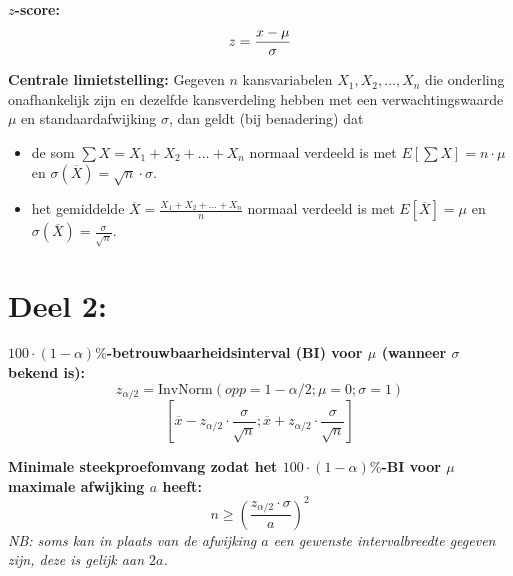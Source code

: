 \documentclass[11pt,a4paper,dutch]{article} %
\begin{document}

\textbf{$z$-score:}
\[
    z = \frac{x - \mu}{\sigma}\\
\]

\textbf{Centrale limietstelling:}
Gegeven $n$ kansvariabelen $X_1, X_2, \ldots, X_n$ die onderling onafhankelijk zijn en dezelfde kansverdeling hebben met een verwachtingswaarde $\mu$ en standaardafwijking $\sigma$, dan geldt (bij benadering) dat
\begin{itemize}
    \item de som $\sum X = X_1 + X_2 + \ldots + X_n$ normaal verdeeld is met $E[\sum X] = n \cdot \mu$ en $\sigma(\overline{X}) = \sqrt{n} \cdot \sigma$.
    \item het gemiddelde $\overline{X} = \frac{X_1 + X_2 + \ldots + X_n}{n}$ normaal verdeeld is met $E[\overline{X}]=\mu$ en $\sigma(\overline{X})=\frac{\sigma}{\sqrt{n}}$.
\end{itemize}

\newpage
\section*{Deel 2:}
\textbf{$100\cdot(1-\alpha)\%$-betrouwbaarheidsinterval (BI) voor $\mu$ (wanneer $\sigma$ bekend is):}
\[
    z_{\alpha/2} = \text{InvNorm}(opp=1-\alpha/2; \mu=0; \sigma=1)
\]
\[
    [\overline{x} - z_{\alpha/2} \cdot \frac{\sigma}{\sqrt{n}}; \overline{x} + z_{\alpha/2} \cdot \frac{\sigma}{\sqrt{n}}]
\]

\textbf{Minimale steekproefomvang zodat het $100\cdot(1-\alpha)\%$-BI voor $\mu$ maximale afwijking $a$ heeft:}
\[
    n \ge \left( \frac{z_{\alpha/2} \cdot \sigma}{a} \right)^2
\]
{\itshape NB: soms kan in plaats van de afwijking $a$ een gewenste intervalbreedte gegeven zijn, deze is gelijk aan $2a$.}
\end{document}
